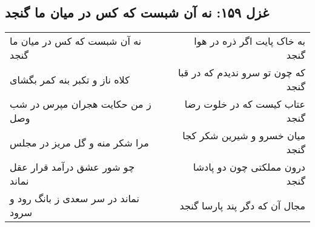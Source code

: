 \begin{center}
\section*{غزل ۱۵۹: نه آن شبست که کس در میان ما گنجد}
\label{sec:159}
\begin{longtable}{l p{0.5cm} r}
نه آن شبست که کس در میان ما گنجد
&&
به خاک پایت اگر ذره در هوا گنجد
\\
کلاه ناز و تکبر بنه کمر بگشای
&&
که چون تو سرو ندیدم که در قبا گنجد
\\
ز من حکایت هجران مپرس در شب وصل
&&
عتاب کیست که در خلوت رضا گنجد
\\
مرا شکر منه و گل مریز در مجلس
&&
میان خسرو و شیرین شکر کجا گنجد
\\
چو شور عشق درآمد قرار عقل نماند
&&
درون مملکتی چون دو پادشا گنجد
\\
نماند در سر سعدی ز بانگ رود و سرود
&&
مجال آن که دگر پند پارسا گنجد
\\
\end{longtable}
\end{center}
